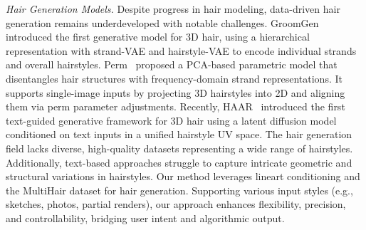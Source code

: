 \vspace{4pt}
\noindent \textit{Hair Generation Models.}
Despite progress in hair modeling, data-driven hair generation remains underdeveloped with notable challenges. GroomGen~\cite{zhou2023groomgen} introduced the first generative model for 3D hair, using a hierarchical representation with strand-VAE and hairstyle-VAE to encode individual strands and overall hairstyles. %
%
Perm~\cite{he2024perm} proposed a PCA-based parametric model that disentangles hair structures with frequency-domain strand representations. It supports single-image inputs by projecting 3D hairstyles into 2D and aligning them via perm parameter adjustments. %
%
Recently, HAAR~\cite{HAAR:CVPR:2024} introduced the first text-guided generative framework for 3D hair using a latent diffusion model conditioned on text inputs in a unified hairstyle UV space. %
The hair generation field lacks diverse, high-quality datasets representing a wide range of hairstyles. Additionally, text-based approaches struggle to capture intricate geometric and structural variations in hairstyles.
%
Our method leverages lineart conditioning and the MultiHair dataset for hair generation. Supporting various input styles (e.g., sketches, photos, partial renders), our approach enhances flexibility, precision, and controllability, bridging user intent and algorithmic output.
